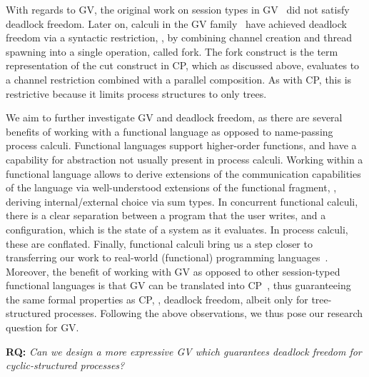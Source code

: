 \documentclass[main.tex]{subfiles}
\begin{document}
With regards to GV, the original work on session types in GV~\cite{gayvasconcelos12} did not satisfy deadlock freedom. Later on, calculi in the GV family~\cite{wadler15,lindleymorris15} have achieved deadlock freedom via a syntactic restriction, \ie, by combining channel creation and thread spawning into a single operation, called fork. The fork construct is the term representation of the cut construct in CP, which as discussed above, evaluates to a channel restriction combined with a parallel composition. As with CP, this is restrictive because it limits process structures to only trees.

We aim to further investigate GV and deadlock freedom, as there are several benefits of working with a functional language as opposed to name-passing process calculi. Functional languages support higher-order functions, and have a capability for abstraction not usually present in process calculi. Working within a functional language allows to derive extensions of the communication capabilities of the language via well-understood extensions of the functional fragment, \ie, deriving internal/external choice via sum types. In concurrent functional calculi, there is a clear separation between a program that the user writes, and a configuration, which is the state of a system as it evaluates. In process calculi, these are conflated. Finally, functional calculi bring us a step closer to transferring our work to real-world (functional) programming languages~\cite{KD21b}.
Moreover, the benefit of working with GV as opposed to other session-typed functional languages is that GV can be translated into CP~\cite{wadler14}, thus guaranteeing the same formal properties as CP, \eg, deadlock freedom, albeit only for tree-structured processes.
Following the above observations, we thus pose our research question for GV.%

\textbf{RQ:} \emph{Can we design a more expressive GV which guarantees deadlock freedom for cyclic-structured processes?}
\end{document}
